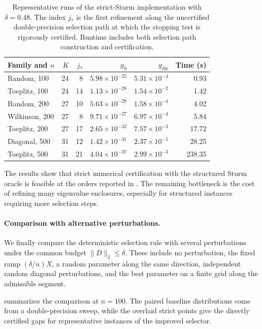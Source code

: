\documentclass[10pt,a4paper]{article}
\begin{document}
\begin{table}[t]
\centering
\caption{Representative runs of the strict-Sturm implementation
with $\delta=0.48$. The index $j_*$ is the first refinement along
the uncertified double-precision selection path at which the
stopping test is rigorously certified. Runtime includes both selection
path construction and certification.}
\label{tab:certified-results}
\small
\begin{tabular}{lrrrrr}
\hline
Family and $n$ & $K$ & $j_*$ & $g_{\mathrm S}$
& $g_{\mathrm{dir}}$ & Time (s)\\
\hline
Random, 100       &24& 8&$5.98\times10^{-25}$&$5.31\times10^{-4}$&0.93\\
Toeplitz, 100     &24&14&$1.13\times10^{-28}$&$1.54\times10^{-2}$&1.42\\
Random, 200       &27&10&$5.63\times10^{-28}$&$1.58\times10^{-4}$&4.02\\
Wilkinson, 200    &27& 8&$9.71\times10^{-27}$&$6.97\times10^{-4}$&5.84\\
Toeplitz, 200     &27&17&$2.65\times10^{-32}$&$7.57\times10^{-3}$&17.72\\
Diagonal, 500     &31&12&$1.42\times10^{-31}$&$2.37\times10^{-5}$&28.25\\
Toeplitz, 500     &31&21&$4.04\times10^{-37}$&$2.99\times10^{-3}$&238.35\\
\hline
\end{tabular}
\end{table}

The results show that strict numerical certification with the
structured Sturm oracle is feasible at the orders reported in
. The remaining bottleneck
is the cost of refining many eigenvalue enclosures, especially
for structured instances requiring more selection steps.


\paragraph{Comparison with alternative perturbations.}
\label{subsec:numerical-baselines}

We finally compare the deterministic selection rule with
several perturbations under the common budget $\|D\|_2\leq\delta$.
These include no perturbation, the fixed ramp $(\delta/n)X$,
a random parameter along the same direction, independent
random diagonal perturbations, and the best parameter on
a finite grid along the admissible segment.

 summarizes the comparison at
$n=100$. The paired baseline distributions come from a
double-precision sweep, while the overlaid strict
points give the directly certified gaps for representative
instances of the improved selector.
\end{document}
